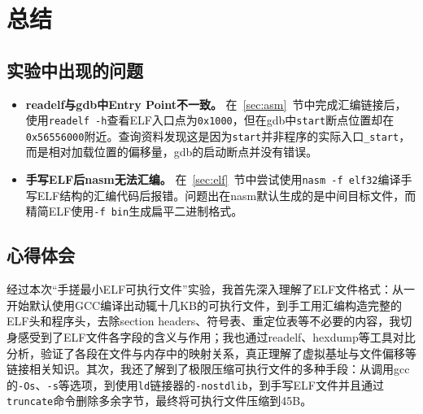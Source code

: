 \documentclass[a4paper, 11pt]{ctexart}
\let\oldsection\section
\renewcommand{\section}{\clearpage\oldsection}
\begin{document}
\section{总结}
\subsection{实验中出现的问题}
\begin{itemize}
        \item \textbf{readelf与gdb中Entry Point不一致。}  
        在\ \ref{sec:asm}\ 节中完成汇编链接后，使用\texttt{readelf -h}查看ELF入口点为\texttt{0x1000}，但在gdb中\texttt{start}断点位置却在\texttt{0x56556000}附近。查询资料发现这是因为\texttt{start}并非程序的实际入口\texttt{\_start}，而是相对加载位置的偏移量，gdb的启动断点并没有错误。
    
        \item \textbf{手写ELF后nasm无法汇编。}  
        在\ \ref{sec:elf}\ 节中尝试使用\texttt{nasm -f elf32}编译手写ELF结构的汇编代码后报错。问题出在nasm默认生成的是中间目标文件，而精简ELF使用\texttt{-f bin}生成扁平二进制格式。
\end{itemize}

\subsection{心得体会}
经过本次“手搓最小ELF可执行文件”实验，我首先深入理解了ELF文件格式：从一开始默认使用GCC编译出动辄十几KB的可执行文件，到手工用汇编构造完整的ELF头和程序头，去除section headers、符号表、重定位表等不必要的内容，我切身感受到了ELF文件各字段的含义与作用；我也通过readelf、hexdump等工具对比分析，验证了各段在文件与内存中的映射关系，真正理解了虚拟基址与文件偏移等链接相关知识。其次，我还了解到了极限压缩可执行文件的多种手段：从调用gcc的\texttt{-Os}、\texttt{-s}等选项，到使用\texttt{ld}链接器的\texttt{-nostdlib}，到手写ELF文件并且通过\texttt{truncate}命令删除多余字节，最终将可执行文件压缩到45B。
\end{document}
